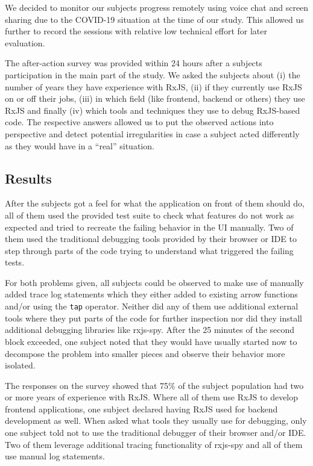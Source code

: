 \documentclass[12pt,a4paper]{article}
\begin{document}
We decided to monitor our subjects progress remotely using voice chat and screen sharing due to the COVID-19 situation at the time of our study. This allowed us further to record the sessions with relative low technical effort for later evaluation.

The after-action survey was provided within 24 hours after a subjects participation in the main part of the study. We asked the subjects about (i) the number of years they have experience with RxJS, (ii) if they currently use RxJS on or off their jobs, (iii) in which field (like frontend, backend or others) they use RxJS and finally (iv) which tools and techniques they use to debug RxJS-based code. The respective answers allowed us to put the observed actions into perspective and detect potential irregularities in case a subject acted differently as they would have in a ``real'' situation.

\subsection{Results}

After the subjects got a feel for what the application on front of them should do, all of them used the provided test suite to check what features do not work as expected and tried to recreate the failing behavior in the UI manually. Two of them used the traditional debugging tools provided by their browser or IDE to step through parts of the code trying to understand what triggered the failing tests.

For both problems given, all subjects could be observed to make use of manually added trace log statements which they either added to existing arrow functions and/or using the \texttt{tap} operator. Neither did any of them use additional external tools where they put parts of the code for further inspection nor did they install additional debugging libraries like rxjs-spy.
After the 25 minutes of the second block exceeded, one subject noted that they would have usually started now to decompose the problem into smaller pieces and observe their behavior more isolated.

The responses on the survey showed that 75\% of the subject population had two or more years of experience with RxJS. Where all of them use RxJS to develop frontend applications, one subject declared having RxJS used for backend development as well. When asked what tools they usually use for debugging, only one subject told not to use the traditional debugger of their browser and/or IDE. Two of them leverage additional tracing functionality of rxjs-spy and all of them use manual log statements.
\end{document}
